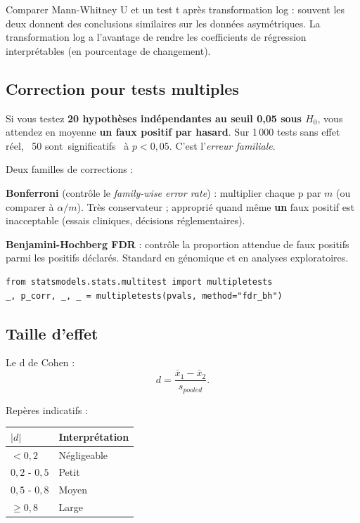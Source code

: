 \documentclass[11pt,a4paper]{article}
\providecommand{\og}{\guillemotleft\,}
\providecommand{\fg}{\,\guillemotright}
\begin{document}
\begin{notebox}
Comparer Mann-Whitney U et un test t apr\`es transformation log :
souvent les deux donnent des conclusions similaires sur les donn\'ees
asym\'etriques. La transformation log a l'avantage de rendre les
coefficients de r\'egression interpr\'etables (en pourcentage de
changement).
\end{notebox}

\subsection{Correction pour tests multiples}

Si vous testez \textbf{20 hypoth\`eses ind\'ependantes au seuil 0{,}05
sous $H_0$}, vous attendez en moyenne \textbf{un faux positif par
hasard}. Sur 1\,000 tests sans effet r\'eel, ~50 sont \og significatifs \fg{}
\`a $p < 0{,}05$. C'est l'\emph{erreur familiale}.

Deux familles de corrections :

\textbf{Bonferroni} (contr\^ole le \emph{family-wise error rate}) :
multiplier chaque p par $m$ (ou comparer \`a $\alpha / m$). Tr\`es
conservateur ; appropri\'e quand m\^eme \textbf{un} faux positif est
inacceptable (essais cliniques, d\'ecisions r\'eglementaires).

\textbf{Benjamini-Hochberg FDR} \citep{benjamini1995controlling} :
contr\^ole la proportion attendue de faux positifs parmi les positifs
d\'eclar\'es. Standard en g\'enomique et en analyses exploratoires.

\begin{verbatim}
from statsmodels.stats.multitest import multipletests
_, p_corr, _, _ = multipletests(pvals, method="fdr_bh")
\end{verbatim}

\subsection{Taille d'effet}

Le d de Cohen :
\[
d = \frac{\bar{x}_1 - \bar{x}_2}{s_{pooled}}.
\]

Rep\`eres indicatifs \citep{cohen1988statistical} :

\begin{center}
\small
\begin{tabular}{ll}
\toprule
$|d|$ & Interpr\'etation \\
\midrule
$< 0{,}2$  & N\'egligeable \\
$0{,}2$ - $0{,}5$ & Petit \\
$0{,}5$ - $0{,}8$ & Moyen \\
$\geq 0{,}8$ & Large \\
\bottomrule
\end{tabular}
\end{center}
\end{document}
